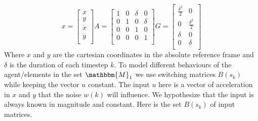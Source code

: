 \documentclass[twocolumn]{article}
\begin{document}
\[ x=\begin{bmatrix} x \\ y \\ \dot{x} \\ \dot{y} \\ \end{bmatrix}  A=\begin{bmatrix}
        1 & 0 & \delta & 0      \\
        0 & 1 & 0      & \delta \\
        0 & 0 & 1      & 0      \\
        0 & 0 & 0      & 1      \\
    \end{bmatrix}
    G=\begin{bmatrix}
        \frac{\delta^{2}}{2} & 0                    \\
        0                    & \frac{\delta^{2}}{2} \\
        \delta               & 0                    \\
        0                    & \delta               \\
    \end{bmatrix}
\]
Where $x$ and $y$ are the cartesian coordinates in the absolute reference frame and $\delta$ is the duration of each timestep $k$.
To model different behaviours of the agent/elements in the set $\mathbbm{M}_{1}$ we use switching matrices $B(s_{k})$ while keeping the vector $u$
constant. The input $u$ here is a vector of acceleration in $x$ and $y$ that the noise $w(k)$ will influence.
We hypothesize that the input is always known in magnitude and constant. Here is the set $B(s_{k})$ of input matrices.
\end{document}
